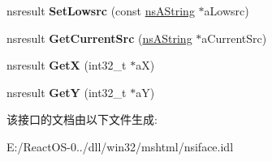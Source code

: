 \begin{DoxyCompactItemize}
nsresult {\bfseries Set\+Lowsrc} (const \hyperlink{structns_string_container}{ns\+A\+String} $\ast$a\+Lowsrc)
\item 
\mbox{\label{interfacens_i_d_o_m_h_t_m_l_image_element_a38cef4cb642b21c47f7c1f52aab79f56}} 
nsresult {\bfseries Get\+Current\+Src} (\hyperlink{structns_string_container}{ns\+A\+String} $\ast$a\+Current\+Src)
\item 
\mbox{\label{interfacens_i_d_o_m_h_t_m_l_image_element_ae5dde594ff9a8b214bb702769a747c88}} 
nsresult {\bfseries GetX} (int32\+\_\+t $\ast$aX)
\item 
\mbox{\label{interfacens_i_d_o_m_h_t_m_l_image_element_a155ce7751b1252c6d5e50b2982d6c3d4}} 
nsresult {\bfseries GetY} (int32\+\_\+t $\ast$aY)
\end{DoxyCompactItemize}


该接口的文档由以下文件生成\+:\begin{DoxyCompactItemize}
\item 
E\+:/\+React\+O\+S-\/0../dll/win32/mshtml/nsiface.\+idl\end{DoxyCompactItemize}
